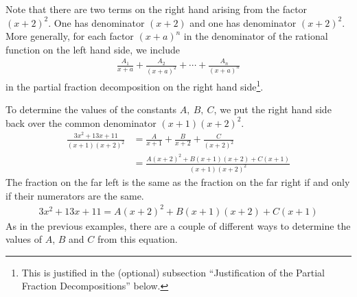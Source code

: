 \begin{eg}
\begin{itemize}
Note that there are two terms on the right hand arising from the factor $(x+2)^2$. One
has denominator $(x+2)$ and one has denominator $(x+2)^2$. More generally, for each factor
$(x+a)^n$ in the denominator of the rational function on the left hand side, we include
\begin{align*}
\frac{A_1}{x+a}
+ \frac{A_2}{(x+a)^2} +\cdots
+ \frac{A_n}{(x+a)^n}
\end{align*}
in the partial fraction decomposition on the right hand side\footnote{ This is justified in
the (optional) subsection ``Justification of the Partial Fraction Decompositions''
below.}.

To determine the values of the constants $A,\ B,\ C$, we put the right hand side back
over the common denominator $(x+1)(x+2)^2$.
\begin{align*}
\frac{3x^2+13x+11}{(x+1)(x+2)^2}
&=\frac{A}{x+1}+\frac{B}{x+2}+\frac{C}{(x+2)^2} \\[0.1in]
&=\frac{A(x+2)^2+B(x+1)(x+2)+C(x+1)}{(x+1)(x+2)^2}
\end{align*}
The fraction on the far left is the same as the fraction on the far right
if and only if their numerators are the same.
\begin{align*}
3x^2+13x+11=A(x+2)^2+B(x+1)(x+2)+C(x+1)
\end{align*}
As in the previous examples, there are a couple of different ways
to determine the values of $A$, $B$ and $C$ from this equation.


\end{itemize}
\end{eg}

